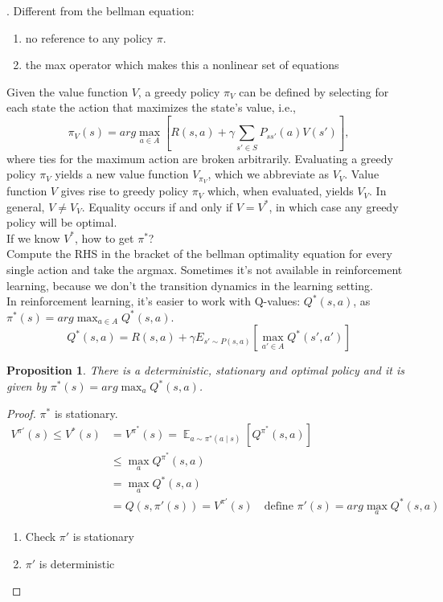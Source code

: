\documentclass{report}
\newtheorem{proposition}{Proposition}[theorem]
\DeclareMathOperator{\E}{\mathbb{E}}
\begin{document}
. Different from the bellman equation:
\begin{enumerate}
    \item no reference to any policy $\pi$.
    \item the max operator which makes this a nonlinear set of equations
\end{enumerate}
Given the value function $V$, a greedy policy $\pi_{V}$ can be defined by selecting for each state the action that maximizes the state's value, i.e.,\[
\pi_{V}(s)=arg\max_{a\in A}[R(s,a)+\gamma \sum_{s' \in S}P_{ss'}(a)V(s')],
\] where ties for the maximum action are broken arbitrarily. Evaluating a greedy policy $\pi_{V}$ yields a new value function $V_{\pi_{V}}$, which we abbreviate as $V_{V}$. Value function $V$ gives rise to greedy policy $\pi_{V}$ which, when evaluated, yields $V_{V}$. In general, $V \neq V_{V}$. Equality occurs if and only if $V=V^*$, in which case any greedy policy will be optimal.\\
If we know $V^*$, how to get $\pi^*$? \\
Compute the RHS in the bracket of the bellman optimality equation for every single action and take the argmax. Sometimes it's not available in reinforcement learning, because we don't the transition dynamics in the learning setting.\\
In reinforcement learning, it's easier to work with Q-values: $Q^*(s,a)$, as $\pi^*(s)=arg\max_{a\in A}Q^*(s,a)$. 
\begin{equation}\label{eq4}
    Q^*(s,a)=R(s,a)+\gamma E_{s'\sim P(s,a)}[\max_{a'\in A}Q^*(s',a')]
\end{equation}
\begin{proposition}
    There is a deterministic, stationary and optimal policy and it is given by $\pi^*(s)=arg\max_{a}Q^*(s,a)$.
\end{proposition}
\begin{proof}
    $\pi^*$ is stationary. 
    \begin{equation*}
        \begin{split}
            V^{\pi'}(s)\leq V^*(s)&=V^{\pi^*}(s)=\E_{a\sim \pi^*(a\mid s)}[Q^{\pi^*}(s,a)]\\
            &\leq \max_{a}Q^{\pi^*}(s,a) \\
            &=\max_{a}Q^*(s,a) \\
            &=Q(s,\pi'(s))=V^{\pi'}(s) \quad \text{define $\pi'(s)=arg\max_{a}Q^*(s,a)$}
        \end{split}
    \end{equation*}
    \begin{enumerate}
        \item Check $\pi'$ is stationary
        \item $\pi'$ is deterministic
    \end{enumerate}
\end{proof}
\end{document}

